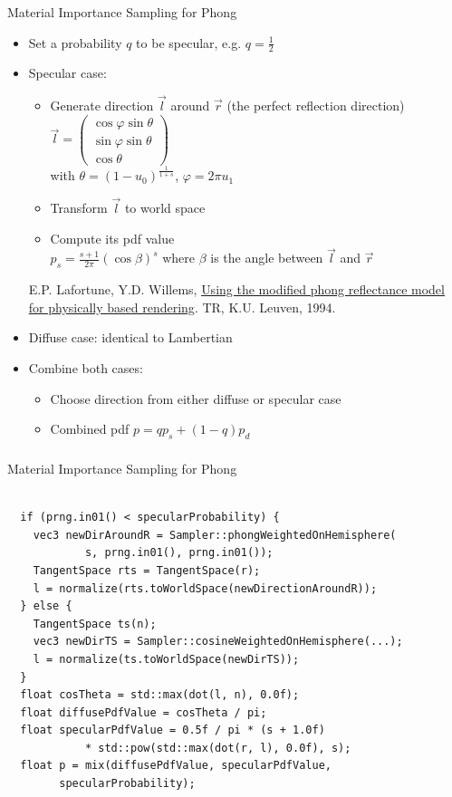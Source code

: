 \documentclass[utf8,stillsansserifmath,fleqn,t]{beamer}
\newcommand{\literature}[1]{{\tiny #1 \par}}
\begin{document}
\begin{frame}
\frametitle{\insertsection}
Material Importance Sampling for Phong
\begin{itemize}
\item Set a probability $q$ to be specular, e.g. $q=\frac{1}{2}$
\item Specular case:
    \begin{itemize}
    \item Generate direction $\vec{l}$ around $\vec{r}$ (the perfect reflection direction)\\
    $\vec{l} = \begin{pmatrix}\cos\varphi\sin\theta \\ \sin\varphi\sin\theta \\ \cos\theta\end{pmatrix}$\\
    with $\theta = (1-u_0)^{\frac{1}{1+s}}$, $\varphi = 2\pi u_1$
    \item Transform $\vec{l}$ to world space
    \item Compute its pdf value\\
    $p_s = \frac{s+1}{2\pi}(\cos\beta)^s$ where $\beta$ is the angle between $\vec{l}$ and $\vec{r}$
    \end{itemize}
    \literature{E.P. Lafortune, Y.D. Willems, \href{https://graphics.cs.kuleuven.be/publications/Phong/Phong_paper.ps}{Using the modified phong reflectance model
    for physically based rendering}. TR, K.U. Leuven, 1994.}
\item Diffuse case: identical to Lambertian
\item Combine both cases:
    \begin{itemize}
    \item Choose direction from either diffuse or specular case
    \item Combined pdf $p = q p_s + (1-q) p_d$
    \end{itemize}
\end{itemize}
\end{frame}

\begin{frame}[fragile]
\frametitle{\insertsection}
Material Importance Sampling for Phong\\~\\
\begin{lstlisting}
  if (prng.in01() < specularProbability) {
    vec3 newDirAroundR = Sampler::phongWeightedOnHemisphere(
            s, prng.in01(), prng.in01());
    TangentSpace rts = TangentSpace(r);
    l = normalize(rts.toWorldSpace(newDirectionAroundR));
  } else {
    TangentSpace ts(n);
    vec3 newDirTS = Sampler::cosineWeightedOnHemisphere(...);
    l = normalize(ts.toWorldSpace(newDirTS));
  }
  float cosTheta = std::max(dot(l, n), 0.0f);
  float diffusePdfValue = cosTheta / pi;
  float specularPdfValue = 0.5f / pi * (s + 1.0f)
            * std::pow(std::max(dot(r, l), 0.0f), s);
  float p = mix(diffusePdfValue, specularPdfValue,
        specularProbability);
\end{lstlisting}
\end{frame}
\end{document}
